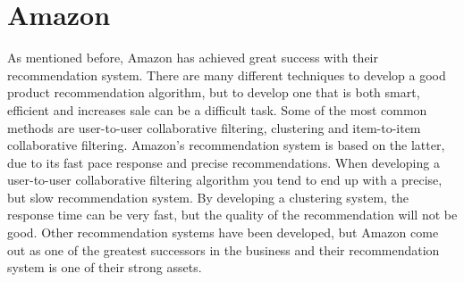 \section{Amazon}
As mentioned before, Amazon has achieved great success with their recommendation system. There are many different techniques to develop a good product recommendation algorithm, but to develop one that is both smart, efficient and increases sale can be a difficult task. Some of the most common methods are user-to-user collaborative filtering, clustering and item-to-item collaborative filtering. Amazon's recommendation system is based on the latter, due to its fast pace response and precise recommendations. When developing a user-to-user collaborative filtering algorithm you tend to end up with a precise, but slow recommendation system. By developing a clustering system, the response time can be very fast, but the quality of the recommendation will not be good. \cite{AmazonRecommendations} Other recommendation systems have been developed, but Amazon come out as one of the greatest successors in the business and their recommendation system is one of their strong assets.
